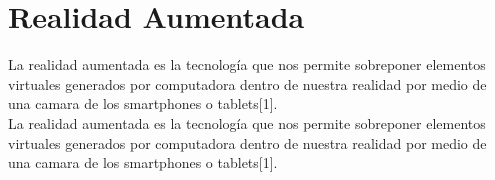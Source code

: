 \section{Realidad Aumentada}
La realidad aumentada es la tecnología que nos permite sobreponer elementos virtuales generados por computadora dentro de nuestra realidad por medio de una camara de los smartphones o tablets[1]. \\

La realidad aumentada es la tecnología que nos permite sobreponer elementos virtuales generados por computadora dentro de nuestra realidad por medio de una camara de los smartphones o tablets[1].


